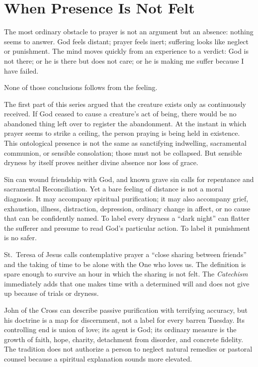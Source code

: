 \section{When Presence Is Not Felt}

The most ordinary obstacle to prayer is not an argument but an absence: nothing seems to answer. God feels distant; prayer feels inert; suffering looks like neglect or punishment. The mind moves quickly from an experience to a verdict: God is not there; or he is there but does not care; or he is making me suffer because I have failed.

None of those conclusions follows from the feeling.

The first part of this series argued that the creature exists only as continuously received. If God ceased to cause a creature's act of being, there would be no abandoned thing left over to register the abandonment. At the instant in which prayer seems to strike a ceiling, the person praying is being held in existence. This ontological presence is not the same as sanctifying indwelling, sacramental communion, or sensible consolation; those must not be collapsed. But sensible dryness by itself proves neither divine absence nor loss of grace.

Sin can wound friendship with God, and known grave sin calls for repentance and sacramental Reconciliation. Yet a bare feeling of distance is not a moral diagnosis. It may accompany spiritual purification; it may also accompany grief, exhaustion, illness, distraction, depression, ordinary change in affect, or no cause that can be confidently named. To label every dryness a ``dark night'' can flatter the sufferer and presume to read God's particular action. To label it punishment is no safer.

St.~Teresa of Jesus calls contemplative prayer a ``close sharing between friends'' and the taking of time to be alone with the One who loves us. The definition is spare enough to survive an hour in which the sharing is not felt. The \emph{Catechism} immediately adds that one makes time with a determined will and does not give up because of trials or dryness.

John of the Cross can describe passive purification with terrifying accuracy, but his doctrine is a map for discernment, not a label for every barren Tuesday. Its controlling end is union of love; its agent is God; its ordinary measure is the growth of faith, hope, charity, detachment from disorder, and concrete fidelity. The tradition does not authorize a person to neglect natural remedies or pastoral counsel because a spiritual explanation sounds more elevated.

